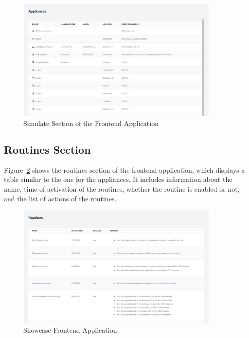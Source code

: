 \begin{figure}
    \centering
    \includegraphics[width=0.9\textwidth]{images/frontend/appliances.png}
    \caption{Simulate Section of the Frontend Application}%
    \label{fig:frontend_appliances}
\end{figure}

\subsection{Routines Section}

Figure~\ref{fig:frontend_routines} shows the routines section of the frontend application, which displays a table similar to the one for the appliances. It includes information about the name, time of activation of the routines, whether the routine is enabled or not, and the list of actions of the routines.

\begin{figure}
    \centering
    \includegraphics[width=0.9\textwidth]{images/frontend/routines.png}
    \caption{Showcase Frontend Application}%
    \label{fig:frontend_routines}
\end{figure}